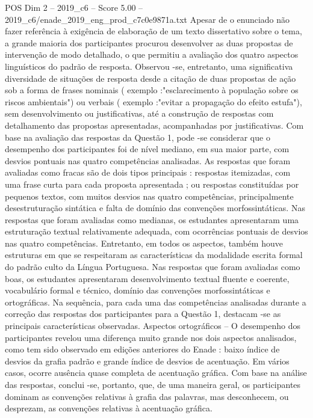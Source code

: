 \begin{textsample}{POS Dim 2 – 2019\_c6 – Score 5.00 – 2019\_c6/enade\_2019\_eng\_prod\_c7c0e9871a.txt}
Apesar de o enunciado não fazer referência à exigência de elaboração de um texto dissertativo sobre o tema, a grande maioria dos participantes procurou desenvolver as duas propostas de intervenção de modo detalhado, o que permitiu a avaliação dos quatro aspectos linguísticos do padrão de resposta.
Observou -se, entretanto, uma significativa diversidade de situações de resposta desde a citação de duas propostas de ação sob a forma de frases nominais ( exemplo :"esclarecimento à população sobre os riscos ambientais") ou verbais ( exemplo :"evitar a propagação do efeito estufa"), sem desenvolvimento ou justificativas, até a construção de respostas com detalhamento das propostas apresentadas, acompanhadas por justificativas.
Com base na avaliação das respostas da Questão 1, pode -se considerar que o desempenho dos participantes foi de nível mediano, em sua maior parte, com desvios pontuais nas quatro competências analisadas.
As respostas que foram avaliadas como fracas são de dois tipos principais : respostas itemizadas, com uma frase curta para cada proposta apresentada ; ou respostas constituídas por pequenos textos, com muitos desvios nas quatro competências, principalmente desestruturação sintática e falta de domínio das convenções morfossintáticas.
Nas respostas que foram avaliadas como medianas, os estudantes apresentaram uma estruturação textual relativamente adequada, com ocorrências pontuais de desvios nas quatro competências.
Entretanto, em todos os aspectos, também houve estruturas em que se respeitaram as características da modalidade escrita formal do padrão culto da Língua Portuguesa.
Nas respostas que foram avaliadas como boas, os estudantes apresentaram desenvolvimento textual fluente e coerente, vocabulário formal e técnico, domínio das convenções morfossintáticas e ortográficas.
Na sequência, para cada uma das competências analisadas durante a correção das respostas dos participantes para a Questão 1, destacam -se as principais características observadas.
Aspectos ortográficos – O desempenho dos participantes revelou uma diferença muito grande nos dois aspectos analisados, como tem sido observado em edições anteriores do Enade : baixo índice de desvios da grafia padrão e grande índice de desvios de acentuação.
Em vários casos, ocorre ausência quase completa de acentuação gráfica.
Com base na análise das respostas, conclui -se, portanto, que, de uma maneira geral, os participantes dominam as convenções relativas à grafia das palavras, mas desconhecem, ou desprezam, as convenções relativas à acentuação gráfica.

\end{textsample}
